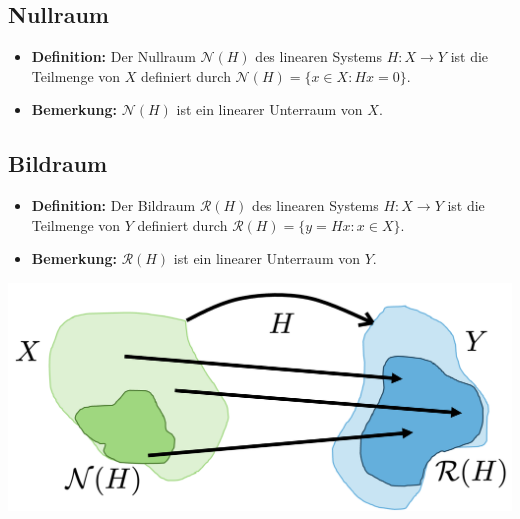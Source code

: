 \documentclass[11pt]{article}
\begin{document}
\vfill \null
\pagebreak

\subsection*{Nullraum}
\vspace*{-0.5cm}
\begin{itemize}[leftmargin = 0pt]
    \item[] \textbf{Definition:} Der Nullraum $\mathcal{N}(H)$ des linearen Systems $H:X \to Y$ ist die Teilmenge von $X$ definiert durch $\mathcal{N}(H) = \{x \in X : Hx = 0\}$.
    \item[] \textbf{Bemerkung:} $\mathcal{N}(H)$ ist ein linearer Unterraum von $X$.
\end{itemize}

\subsection*{Bildraum}
\vspace*{-0.5cm}
\begin{itemize}[leftmargin = 0pt]
    \item[] \textbf{Definition:} Der Bildraum $\mathcal{R}(H)$ des linearen Systems $H:X \to Y$ ist die Teilmenge von $Y$ definiert durch $\mathcal{R}(H) = \{y =Hx : x \in X\}$.
    \item[] \textbf{Bemerkung:} $\mathcal{R}(H)$ ist ein linearer Unterraum von $Y$.
\end{itemize}

\begin{center}
    \includegraphics[width = 0.7\linewidth]{docimgs/Bildraum_Nullraum.png}
\end{center}
\end{document}
